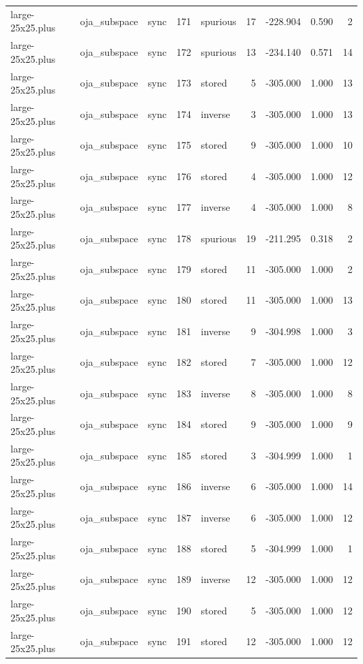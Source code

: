 \begin{tabular}{lllrlrrrr}
large-25x25.plus & oja\_subspace & sync & 171 & spurious & 17 & -228.904 & 0.590 & 2 \\
large-25x25.plus & oja\_subspace & sync & 172 & spurious & 13 & -234.140 & 0.571 & 14 \\
large-25x25.plus & oja\_subspace & sync & 173 & stored & 5 & -305.000 & 1.000 & 13 \\
large-25x25.plus & oja\_subspace & sync & 174 & inverse & 3 & -305.000 & 1.000 & 13 \\
large-25x25.plus & oja\_subspace & sync & 175 & stored & 9 & -305.000 & 1.000 & 10 \\
large-25x25.plus & oja\_subspace & sync & 176 & stored & 4 & -305.000 & 1.000 & 12 \\
large-25x25.plus & oja\_subspace & sync & 177 & inverse & 4 & -305.000 & 1.000 & 8 \\
large-25x25.plus & oja\_subspace & sync & 178 & spurious & 19 & -211.295 & 0.318 & 2 \\
large-25x25.plus & oja\_subspace & sync & 179 & stored & 11 & -305.000 & 1.000 & 2 \\
large-25x25.plus & oja\_subspace & sync & 180 & stored & 11 & -305.000 & 1.000 & 13 \\
large-25x25.plus & oja\_subspace & sync & 181 & inverse & 9 & -304.998 & 1.000 & 3 \\
large-25x25.plus & oja\_subspace & sync & 182 & stored & 7 & -305.000 & 1.000 & 12 \\
large-25x25.plus & oja\_subspace & sync & 183 & inverse & 8 & -305.000 & 1.000 & 8 \\
large-25x25.plus & oja\_subspace & sync & 184 & stored & 9 & -305.000 & 1.000 & 9 \\
large-25x25.plus & oja\_subspace & sync & 185 & stored & 3 & -304.999 & 1.000 & 1 \\
large-25x25.plus & oja\_subspace & sync & 186 & inverse & 6 & -305.000 & 1.000 & 14 \\
large-25x25.plus & oja\_subspace & sync & 187 & inverse & 6 & -305.000 & 1.000 & 12 \\
large-25x25.plus & oja\_subspace & sync & 188 & stored & 5 & -304.999 & 1.000 & 1 \\
large-25x25.plus & oja\_subspace & sync & 189 & inverse & 12 & -305.000 & 1.000 & 12 \\
large-25x25.plus & oja\_subspace & sync & 190 & stored & 5 & -305.000 & 1.000 & 12 \\
large-25x25.plus & oja\_subspace & sync & 191 & stored & 12 & -305.000 & 1.000 & 12 \\

\end{tabular}
